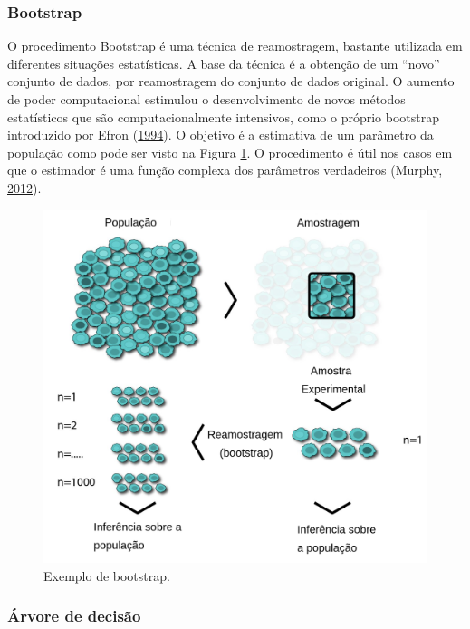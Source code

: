 \documentclass[
	12pt,				%
	a4paper,		%
	oneside,    %
	chapter=TITLE,		   %
	section=TITLE,		   %
	subsection=TITLE,	   %
	subsubsection=TITLE, %
	english,			%
	french,				%
	spanish,			%
	brazil,				%
]{abntex2}
\begin{document}
\hypertarget{bootstrap}{%
\subsubsection{Bootstrap}\label{bootstrap}}

O procedimento Bootstrap é uma técnica de reamostragem, bastante
utilizada em diferentes situações estatísticas. A base da técnica é a
obtenção de um ``novo'' conjunto de dados, por reamostragem do conjunto
de dados original. O aumento de poder computacional estimulou o
desenvolvimento de novos métodos estatísticos que são computacionalmente
intensivos, como o próprio bootstrap introduzido por Efron
(\protect\hyperlink{ref-efron1994introduction}{1994}). O objetivo é a
estimativa de um parâmetro da população como pode ser visto na Figura
\ref{fig:bootstrap}. O procedimento é útil nos casos em que o estimador
é uma função complexa dos parâmetros verdadeiros (Murphy,
\protect\hyperlink{ref-murphy2012probabilistic}{2012}).

\begin{figure}
\centering
\includegraphics[width=\textwidth,height=0.4\textheight]{../fig/bootstrap_traduzido.png}
\caption{Exemplo de bootstrap.\label{fig:bootstrap}}
\end{figure}

\hypertarget{uxe1rvore-de-decisuxe3o}{%
\subsubsection{Árvore de decisão}\label{uxe1rvore-de-decisuxe3o}}
\end{document}
